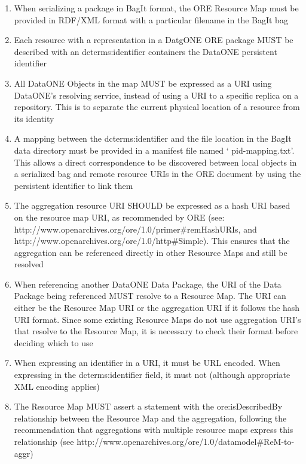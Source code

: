 \documentclass[conference]{IEEEtran}
\begin{document}
\begin{enumerate}
  \item{When serializing a package in BagIt format, the ORE Resource Map must be provided in RDF/XML format with a particular filename in the BagIt bag}
  \item{Each resource with a representation in a DatgONE ORE package MUST be described with an dcterms:identifier containers the DataONE persistent identifier}
  \item{All DataONE Objects in the map MUST be expressed as a URI using DataONE’s resolving service, instead of using a URI to a specific replica on a repository. This is to separate the current physical location of a resource from its identity}
  \item{A mapping between the dcterms:identifier and the file location in the BagIt data directory must be provided in a manifest file named ‘ pid-mapping.txt’. This allows a direct correspondence to be discovered between local objects in a serialized bag and remote resource URIs in the ORE document by using the persistent identifier to link them}
  \item{The aggregation resource URI SHOULD be expressed as a hash URI based on the resource map URI, as recommended by ORE (see: http://www.openarchives.org/ore/1.0/primer\#remHashURIs, and http://www.openarchives.org/ore/1.0/http\#Simple). This ensures that the aggregation can be referenced directly in other Resource Maps and still be resolved}
  \item{When referencing another DataONE Data Package, the URI of the Data Package being referenced MUST resolve to a Resource Map. The URI can either be the Resource Map URI or the aggregation URI if it follows the hash URI format. Since some existing Resource Maps do not use aggregation URI’s that resolve to the Resource Map, it is necessary to check their format before deciding which to use}
  \item{When expressing an identifier in a URI, it must be URL encoded. When expressing in the dcterms:identifier field, it must not (although appropriate XML encoding applies)}
  \item{The Resource Map MUST assert a statement with the ore:isDescribedBy relationship between the Resource Map and the aggregation, following the recommendation that aggregations with multiple resource maps express this relationship (see http://www.openarchives.org/ore/1.0/datamodel\#ReM-to-aggr)}
\end{enumerate}
\end{document}
